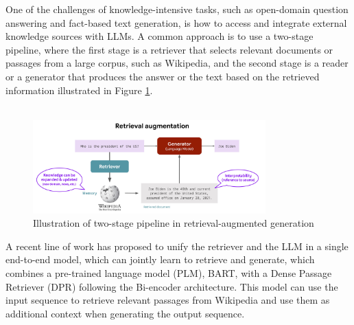 One of the challenges of knowledge-intensive tasks, such as open-domain question answering and fact-based text generation, is how to access and integrate external knowledge sources with LLMs. A common approach is to use a two-stage pipeline, where the first stage is a retriever that selects relevant documents or passages from a large corpus, such as Wikipedia, and the second stage is a reader or a generator that produces the answer or the text based on the retrieved information illustrated in Figure \ref{fig:rag}.\\\\
\begin{figure}[hbt]
    \centering
    \includegraphics[width=0.8\textwidth]{related-work/images/rag.png}
    \caption{Illustration of two-stage pipeline in retrieval-augmented generation}
    \label{fig:rag}
\end{figure}
A recent line of work \cite{lewis2020retrieval} has proposed to unify the retriever and the LLM in a single end-to-end model, which can jointly learn to retrieve and generate, which combines a pre-trained language model (PLM), BART, with a Dense Passage Retriever (DPR) following the Bi-encoder architecture. This model can use the input sequence to retrieve relevant passages from Wikipedia and use them as additional context when generating the output sequence.
